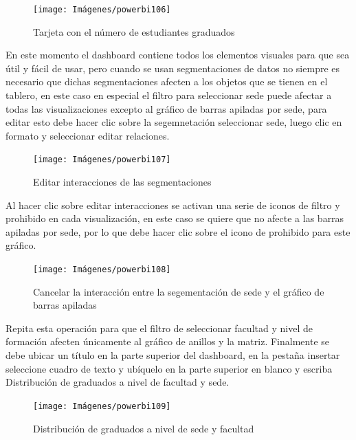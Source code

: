 \documentclass[
]{book}
\begin{document}
\begin{figure}

{\centering \texttt{[image: Imágenes/powerbi106]} 

}

\caption{Tarjeta con el número de estudiantes graduados}\label{fig:paso2tarjeta-fig}
\end{figure}

En este momento el dashboard contiene todos los elementos visuales para que sea útil y fácil de usar, pero cuando se usan segmentaciones de datos no siempre es necesario que dichas segmentaciones afecten a los objetos que se tienen en el tablero, en este caso en especial el filtro para seleccionar sede puede afectar a todas las visualizaciones excepto al gráfico de barras apiladas por sede, para editar esto debe hacer clic sobre la segemnetación seleccionar sede, luego clic en formato y seleccionar editar relaciones.

\begin{figure}

{\centering \texttt{[image: Imágenes/powerbi107]} 

}

\caption{Editar interacciones de las segmentaciones}\label{fig:editarinteracciones-fig}
\end{figure}

Al hacer clic sobre editar interacciones se activan una serie de iconos de filtro y prohibido en cada visualización, en este caso se quiere que no afecte a las barras apiladas por sede, por lo que debe hacer clic sobre el icono de prohibido para este gráfico.

\begin{figure}

{\centering \texttt{[image: Imágenes/powerbi108]} 

}

\caption{Cancelar la interacción entre la segementación de  sede y el gráfico de barras apiladas}\label{fig:editarinteraccionessedeybarrasapiladassede-fig}
\end{figure}

Repita esta operación para que el filtro de seleccionar facultad y nivel de formación afecten únicamente al gráfico de anillos y la matriz. Finalmente se debe ubicar un título en la parte superior del dashboard, en la pestaña insertar seleccione cuadro de texto y ubíquelo en la parte superior en blanco y escriba Distribución de graduados a nivel de facultad y sede.

\begin{figure}

{\centering \texttt{[image: Imágenes/powerbi109]} 

}

\caption{Distribución de graduados a nivel de sede y facultad}\label{fig:tablerodistribucuondegraduadossedeyfacultad-fig}
\end{figure}
\end{document}
